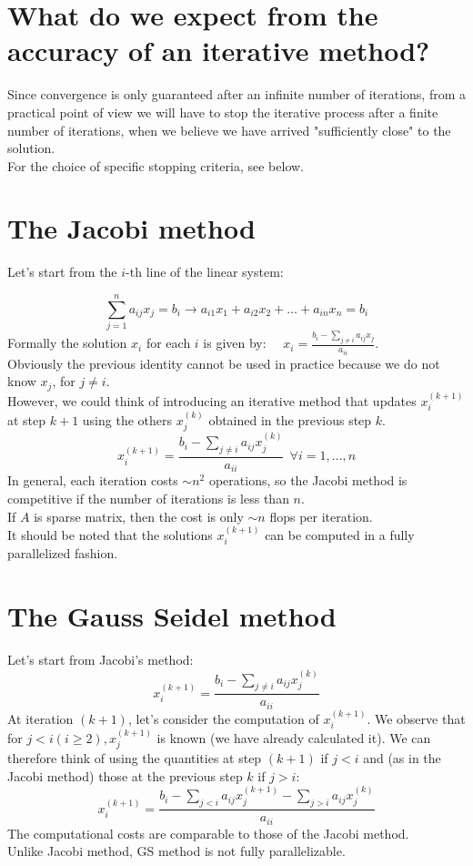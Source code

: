 \documentclass[11pt]{book}
\begin{document}
\section*{What do we expect from the accuracy of an iterative method?}
Since convergence is only guaranteed after an infinite number of iterations, from a practical point of view we will have to stop the iterative process after a finite number of iterations, when we believe we have arrived "sufficiently close" to the solution. \\
For the choice of specific stopping criteria, see below.\\


\section*{The Jacobi method}
Let's start from the $i$-th line of the linear system:

$$
\sum_{j=1}^{n} a_{i j} x_{j}=b_{i} \rightarrow a_{i 1} x_{1}+a_{i 2} x_{2}+\ldots+a_{i n} x_{n}=b_{i}
$$
Formally the solution $x_{i}$ for each $i$ is given by: $\quad x_{i}=\frac{b_{i}-\sum_{j \neq i} a_{i j} x_{j}}{a_{i i}}$.\\
Obviously the previous identity cannot be used in practice because we do not know $x_{j}$, for $j \neq i$.\\
However, we could think of introducing an iterative method that updates $x_{i}^{(k+1)}$ at step $k+1$ using the others $x_{j}^{(k)}$ obtained in the previous step $k$.
$$x_i^{(k+1)}=\frac{b_i-\sum_{j \neq i} a_{i j} x_j^{(k)}}{a_{i i}} \ \ \forall i=1, \ldots, n
$$
In general, each iteration costs $\sim n^{2}$ operations, so the Jacobi method is competitive if the number of iterations is less than $n$.\\
If $A$ is sparse matrix, then the cost is only $\sim n$ flops per iteration.\\
It should be noted that the solutions $x_{i}^{(k+1)}$ can be computed in a fully parallelized fashion.

 \section*{The Gauss Seidel method}
 Let's start from Jacobi's method:
$$
x_{i}^{(k+1)}=\frac{b_{i}-\sum_{j \neq i} a_{i j} x_{j}^{(k)}}{a_{i i}}
$$
At iteration $(k+1)$, let's consider the computation of $x_{i}^{(k+1)}$. We observe that for $j<i(i \geq 2), x_{j}^{(k+1)}$ is known (we have already calculated it). We can therefore think of using the quantities at step $(k+1)$ if $j<i$ and (as in the Jacobi method) those at the previous step $k$ if $j>i$:
$$
x_{i}^{(k+1)}=\frac{b_{i}-\sum_{j<i} a_{i j} x_{j}^{(k+1)}-\sum_{j>i} a_{i j} x_{j}^{(k)}}{a_{i i}}
$$
The computational costs are comparable to those of the Jacobi method.\\
Unlike Jacobi method, GS method is not fully parallelizable.
\end{document}
